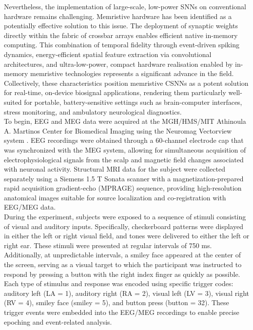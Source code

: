 \noindent Nevertheless, the implementation of large-scale, low-power SNNs on conventional hardware remains challenging. Memristive hardware has been identified as a potentially effective solution to this issue. The deployment of synaptic weights directly within the fabric of crossbar arrays enables efficient native in-memory computing. This combination of temporal fidelity through event-driven spiking dynamics, energy-efficient spatial feature extraction via convolutional architectures, and ultra-low-power, compact hardware realisation enabled by in-memory memristive technologies represents a significant advance in the field.\\

\noindent Collectively, these characteristics position memristive CSNNs as a potent solution for real-time, on-device biosignal applications, rendering them particularly well-suited for portable, battery-sensitive settings such as brain-computer interfaces, stress monitoring, and ambulatory neurological diagnostics.\\

\noindent To begin, EEG and MEG data were acquired at the MGH/HMS/MIT Athinoula A. Martinos Center for Biomedical Imaging using the Neuromag Vectorview system \cite{Gramfort2020-jm}. EEG recordings were obtained through a 60-channel electrode cap that was synchronized with the MEG system, allowing for simultaneous acquisition of electrophysiological signals from the scalp and magnetic field changes associated with neuronal activity. Structural MRI data for the subject were collected separately using a Siemens 1.5 T Sonata scanner with a magnetization-prepared rapid acquisition gradient-echo (MPRAGE) sequence, providing high-resolution anatomical images suitable for source localization and co-registration with EEG/MEG data.\\

\noindent During the experiment, subjects were exposed to a sequence of stimuli consisting of visual and auditory inputs. Specifically, checkerboard patterns were displayed in either the left or right visual field, and tones were delivered to either the left or right ear. These stimuli were presented at regular intervals of 750 ms. Additionally, at unpredictable intervals, a smiley face appeared at the center of the screen, serving as a visual target to which the participant was instructed to respond by pressing a button with the right index finger as quickly as possible.\\

\noindent Each type of stimulus and response was encoded using specific trigger codes: auditory left (LA = 1), auditory right (RA = 2), visual left (LV = 3), visual right (RV = 4), smiley face (smiley = 5), and button press (button = 32). These trigger events were embedded into the EEG/MEG recordings to enable precise epoching and event-related analysis.\\

